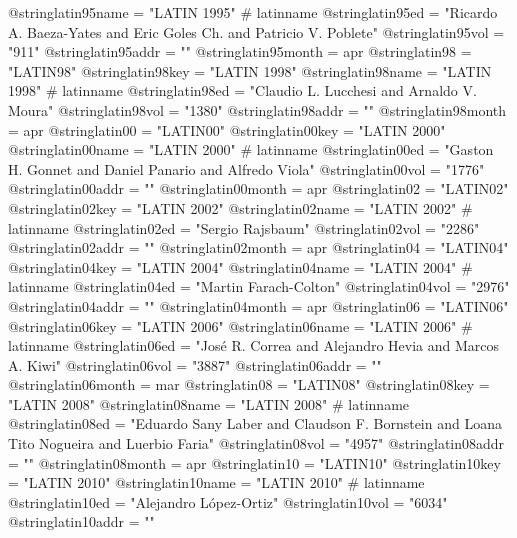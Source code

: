 @string{latin95name =           "LATIN 1995" # latinname}
@string{latin95ed =             "Ricardo A. Baeza-Yates and Eric Goles Ch. and Patricio V. Poblete"}
@string{latin95vol =            "911"}
@string{latin95addr =           ""}
@string{latin95month =          apr}
@string{latin98 =               "LATIN98"}
@string{latin98key =            "LATIN 1998"}
@string{latin98name =           "LATIN 1998" # latinname}
@string{latin98ed =             "Claudio L. Lucchesi and Arnaldo V. Moura"}
@string{latin98vol =            "1380"}
@string{latin98addr =           ""}
@string{latin98month =          apr}
@string{latin00 =               "LATIN00"}
@string{latin00key =            "LATIN 2000"}
@string{latin00name =           "LATIN 2000" # latinname}
@string{latin00ed =             "Gaston H. Gonnet and Daniel Panario and Alfredo Viola"}
@string{latin00vol =            "1776"}
@string{latin00addr =           ""}
@string{latin00month =          apr}
@string{latin02 =               "LATIN02"}
@string{latin02key =            "LATIN 2002"}
@string{latin02name =           "LATIN 2002" # latinname}
@string{latin02ed =             "Sergio Rajsbaum"}
@string{latin02vol =            "2286"}
@string{latin02addr =           ""}
@string{latin02month =          apr}
@string{latin04 =               "LATIN04"}
@string{latin04key =            "LATIN 2004"}
@string{latin04name =           "LATIN 2004" # latinname}
@string{latin04ed =             "Martin Farach-Colton"}
@string{latin04vol =            "2976"}
@string{latin04addr =           ""}
@string{latin04month =          apr}
@string{latin06 =               "LATIN06"}
@string{latin06key =            "LATIN 2006"}
@string{latin06name =           "LATIN 2006" # latinname}
@string{latin06ed =             "Jos{\'e} R. Correa and Alejandro Hevia and Marcos A. Kiwi"}
@string{latin06vol =            "3887"}
@string{latin06addr =           ""}
@string{latin06month =          mar}
@string{latin08 =               "LATIN08"}
@string{latin08key =            "LATIN 2008"}
@string{latin08name =           "LATIN 2008" # latinname}
@string{latin08ed =             "Eduardo Sany Laber and Claudson F. Bornstein and Loana Tito Nogueira and Luerbio Faria"}
@string{latin08vol =            "4957"}
@string{latin08addr =           ""}
@string{latin08month =          apr}
@string{latin10 =               "LATIN10"}
@string{latin10key =            "LATIN 2010"}
@string{latin10name =           "LATIN 2010" # latinname}
@string{latin10ed =             "Alejandro L{\'o}pez-Ortiz"}
@string{latin10vol =            "6034"}
@string{latin10addr =           ""}
